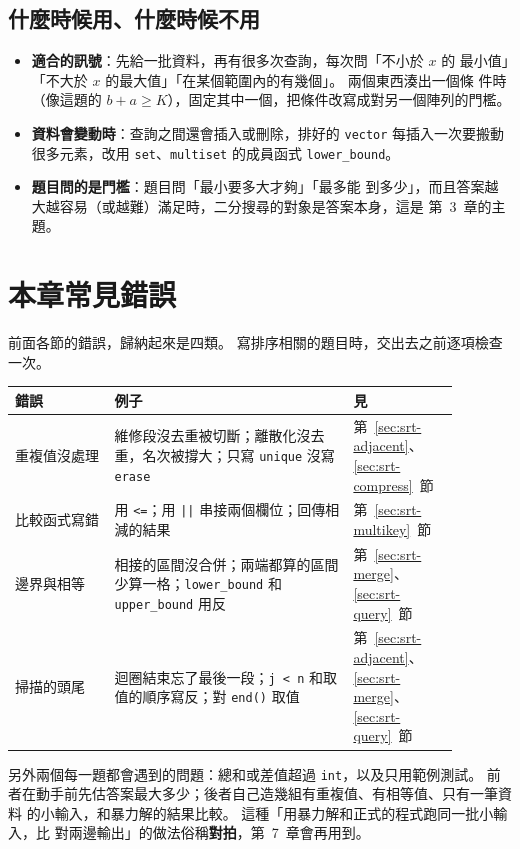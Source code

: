 \subsection{什麼時候用、什麼時候不用}

\begin{itemize}
\item \textbf{適合的訊號}：先給一批資料，再有很多次查詢，每次問「不小於 $x$ 的
最小值」「不大於 $x$ 的最大值」「在某個範圍內的有幾個」。 兩個東西湊出一個條
件時（像這題的 $b + a \ge K$），固定其中一個，把條件改寫成對另一個陣列的門檻。
\item \textbf{資料會變動時}：查詢之間還會插入或刪除，排好的 \texttt{vector}
每插入一次要搬動很多元素，改用 \texttt{set}、\texttt{multiset} 的成員函式
\texttt{lower\_bound}。
\item \textbf{題目問的是門檻}：題目問「最小要多大才夠」「最多能
到多少」，而且答案越大越容易（或越難）滿足時，二分搜尋的對象是答案本身，這是
第~3~章的主題。
\end{itemize}

\section{本章常見錯誤}
\label{sec:srt-pitfalls}

前面各節的錯誤，歸納起來是四類。 寫排序相關的題目時，交出去之前逐項檢查一次。

\begin{center}
\begin{tabular}{p{0.2\linewidth}p{0.48\linewidth}p{0.2\linewidth}}
\toprule
錯誤 & 例子 & 見 \\
\midrule
重複值沒處理 & 維修段沒去重被切斷；離散化沒去重，名次被撐大；只寫
\texttt{unique} 沒寫 \texttt{erase} & 第~\ref{sec:srt-adjacent}、\ref{sec:srt-compress}~節 \\
比較函式寫錯 & 用 \texttt{<=}；用 \texttt{||} 串接兩個欄位；回傳相減的結果 &
第~\ref{sec:srt-multikey}~節 \\
邊界與相等 & 相接的區間沒合併；兩端都算的區間少算一格；\texttt{lower\_bound}
和 \texttt{upper\_bound} 用反 & 第~\ref{sec:srt-merge}、\ref{sec:srt-query}~節 \\
掃描的頭尾 & 迴圈結束忘了最後一段；\texttt{j < n} 和取值的順序寫反；對
\texttt{end()} 取值 & 第~\ref{sec:srt-adjacent}、\ref{sec:srt-merge}、\ref{sec:srt-query}~節 \\
\bottomrule
\end{tabular}
\end{center}

另外兩個每一題都會遇到的問題：總和或差值超過 \texttt{int}，以及只用範例測試。
前者在動手前先估答案最大多少；後者自己造幾組有重複值、有相等值、只有一筆資料
的小輸入，和暴力解的結果比較。 這種「用暴力解和正式的程式跑同一批小輸入，比
對兩邊輸出」的做法俗稱\textbf{對拍}，第~7~章會再用到。

